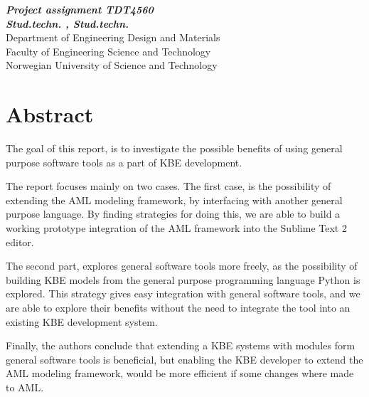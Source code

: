 \begin{center}
{\Large\bfseries \mytitle}
\end{center}

\begin{center}
{\bfseries\slshape Project assignment TDT4560}
\\[1.0cm]
{\bfseries\slshape
Stud.techn. \myauthorA, Stud.techn. \myauthorB \\}
Department of Engineering Design and Materials \\
Faculty of Engineering Science and Technology\\
Norwegian University of Science and Technology
\end{center}
\section*{Abstract}

The goal of this report, is to investigate the possible benefits of using general purpose software tools as a part of KBE development.

The report focuses mainly on two cases. The first case, is the possibility of extending the AML modeling framework, by interfacing with another general purpose language. By finding strategies for doing this, we are able to build a working prototype integration of the AML framework into the Sublime Text 2 editor.

The second part, explores general software tools more freely, as the possibility of building KBE models from the general purpose programming language Python is explored. This strategy gives easy integration with general software tools, and we are able to explore their benefits without the need to integrate the tool into an existing KBE development system.

Finally, the authors conclude that extending a KBE systems with modules form general software tools is beneficial, but enabling the KBE developer to extend the AML modeling framework, would be more efficient if some changes where made to AML.
